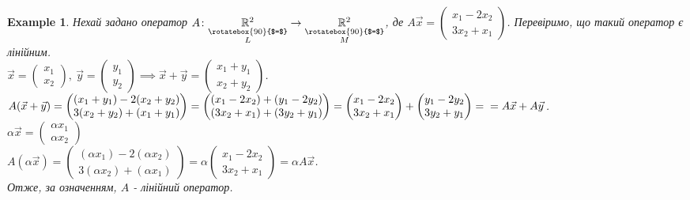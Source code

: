 \documentclass[a4paper, 10pt]{article}
\theoremstyle{theoremdd}
\newtheorem{example}[theorem]{Example}
\begin{document}
	\begin{example}
	Нехай задано оператор $A \colon \underset{\substack{\rotatebox{90}{$=$} \\ L}}{\mathbb{R}^2} \to \underset{\substack{\rotatebox{90}{$=$} \\ M}}{\mathbb{R}^2}$, де \quad $\displaystyle A\vec{x} = \begin{pmatrix} x_1 - 2x_2 \\ 3x_2 + x_1 \end{pmatrix}$. Перевіримо, що такий оператор є лінійним.\\
	$\displaystyle \vec{x} = \begin{pmatrix} x_1 \\ x_2 \end{pmatrix},\ \vec{y} = \begin{pmatrix} y_1 \\ y_2 \end{pmatrix} \implies \vec{x} + \vec{y} = \begin{pmatrix}
	x_1 + y_1 \\ x_2 + y_2
	\end{pmatrix}$.\\
	$A(\vec{x} + \vec{y}) = \begin{pmatrix} (x_1+y_1)-2(x_2+y_2) \\ 3(x_2+y_2)+(x_1+y_1) \end{pmatrix} = \begin{pmatrix} (x_1-2x_2) + (y_1-2y_2) \\ (3x_2+x_1) + (3y_2+y_1) \end{pmatrix} = \begin{pmatrix} x_1 - 2x_2 \\ 3x_2 + x_1 \end{pmatrix} + \begin{pmatrix} y_1 - 2y_2 \\ 3y_2 + y_1 \end{pmatrix} = \\ = A\vec{x} + A\vec{y}$.\\
	$\alpha \vec{x} = \begin{pmatrix} \alpha x_1 \\ \alpha x_2 \end{pmatrix}$\\
	$A(\alpha \vec{x}) = \begin{pmatrix} (\alpha x_1) - 2(\alpha x_2) \\ 3(\alpha x_2) + (\alpha x_1) \end{pmatrix} = \alpha \begin{pmatrix} x_1 - 2x_2 \\ 3x_2 + x_1 \end{pmatrix} = \alpha A\vec{x}$.\\
	Отже, за означенням, $A$ - лінійний оператор.
	\end{example}
	
\end{document}
